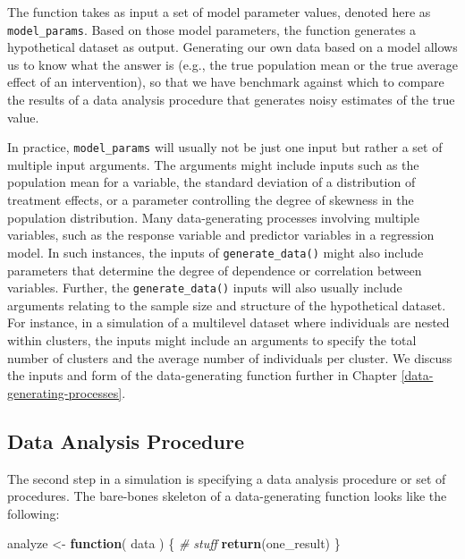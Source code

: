 \documentclass[
]{book}
\newenvironment{Shaded}{\begin{snugshade}}{\end{snugshade}}
\newcommand{\CommentTok}[1]{\textcolor[rgb]{0.56,0.35,0.01}{\textit{#1}}}
\newcommand{\ControlFlowTok}[1]{\textcolor[rgb]{0.13,0.29,0.53}{\textbf{#1}}}
\newcommand{\FunctionTok}[1]{\textcolor[rgb]{0.13,0.29,0.53}{\textbf{#1}}}
\newcommand{\NormalTok}[1]{#1}
\newcommand{\OtherTok}[1]{\textcolor[rgb]{0.56,0.35,0.01}{#1}}
\begin{document}
The function takes as input a set of model parameter values, denoted here as \texttt{model\_params}.
Based on those model parameters, the function generates a hypothetical dataset as output.
Generating our own data based on a model allows us to know what the answer is (e.g., the true population mean or the true average effect of an intervention), so that we have benchmark against which to compare the results of a data analysis procedure that generates noisy estimates of the true value.

In practice, \texttt{model\_params} will usually not be just one input but rather a set of multiple input arguments.
The arguments might include inputs such as the population mean for a variable, the standard deviation of a distribution of treatment effects, or a parameter controlling the degree of skewness in the population distribution.
Many data-generating processes involving multiple variables, such as the response variable and predictor variables in a regression model.
In such instances, the inputs of \texttt{generate\_data()} might also include parameters that determine the degree of dependence or correlation between variables.
Further, the \texttt{generate\_data()} inputs will also usually include arguments relating to the sample size and structure of the hypothetical dataset.
For instance, in a simulation of a multilevel dataset where individuals are nested within clusters, the inputs might include an arguments to specify the total number of clusters and the average number of individuals per cluster.
We discuss the inputs and form of the data-generating function further in Chapter \ref{data-generating-processes}.

\subsection{Data Analysis Procedure}\label{data-analysis-procedure}

The second step in a simulation is specifying a data analysis procedure or set of procedures.
The bare-bones skeleton of a data-generating function looks like the following:

\begin{Shaded}
\begin{Highlighting}[]
\NormalTok{analyze }\OtherTok{\textless{}{-}} \ControlFlowTok{function}\NormalTok{( data ) \{}
  \CommentTok{\# stuff}
  \FunctionTok{return}\NormalTok{(one\_result)}
\NormalTok{\}}
\end{Highlighting}
\end{Shaded}
\end{document}
